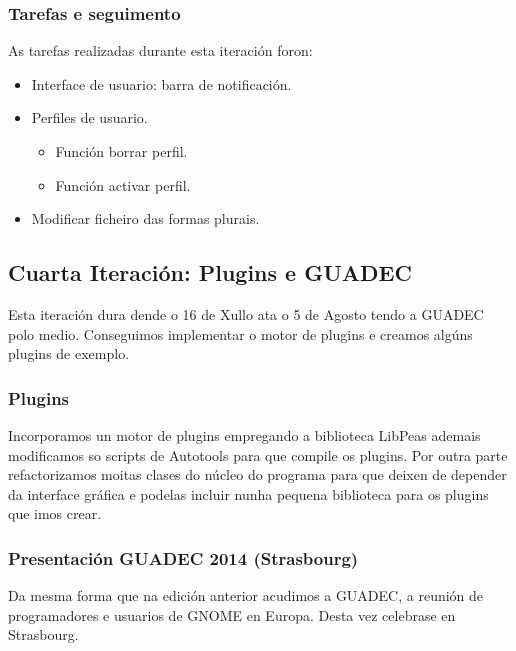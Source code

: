 \subsubsection{Tarefas e seguimento}

As tarefas realizadas durante esta iteración foron:

\begin{itemize}
  \item Interface de usuario: barra de notificación.
  \item Perfiles de usuario.
    \begin {itemize}
      \item Función borrar perfil.
      \item Función activar perfil.
    \end{itemize}
  \item Modificar ficheiro das formas plurais.
\end{itemize}

\subsection{Cuarta Iteración: Plugins e GUADEC} %
Esta iteración dura dende o 16 de Xullo ata o 5 de Agosto tendo a GUADEC polo medio. Conseguimos implementar o motor de plugins e creamos algúns plugins de exemplo.

\subsubsection{Plugins}
Incorporamos un motor de plugins empregando a biblioteca LibPeas ademais modificamos so scripts de Autotools para que compile os plugins. Por outra parte refactorizamos moitas clases do núcleo do programa para que deixen de depender da interface gráfica e podelas incluir nunha pequena biblioteca para os plugins que imos crear.

\subsubsection{Presentación GUADEC 2014 (Strasbourg)}
Da mesma forma que na edición anterior acudimos a GUADEC, a reunión de programadores e usuarios de GNOME en Europa. Desta vez celebrase en Strasbourg.

